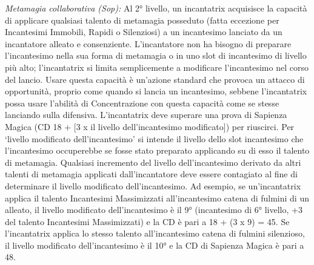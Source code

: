 \documentclass[a4paper]{report}
\begin{document}
\begin{multicols}{2}
\textit{Metamagia collaborativa (Sop):} Al 2° livello, un incantatrix acquisisce la capacità di applicare qualsiasi talento di metamagia posseduto (fatta eccezione per Incantesimi Immobili, Rapidi o Silenziosi) a un incantesimo lanciato da un incantatore alleato e consenziente. L'incantatore non ha bisogno di preparare l'incantesimo nella sua forma di metamagia o in uno slot di incantesimo di livello più alto; l'incantatrix si limita semplicemente a modificare l'incantesimo nel corso del lancio. Usare questa capacità è un'azione standard che provoca un attacco di opportunità, proprio come quando si lancia un incantesimo, sebbene l'incantatrix possa usare l'abilità di Concentrazione con questa capacità come se stesse lanciando sulla difensiva. L'incantatrix deve superare una prova di Sapienza Magica (CD 18 + [3 x il livello dell'incantesimo modificato]) per riuscirci. Per \enquote*{livello modificato dell'incantesimo} si intende il livello dello slot incantesimo che l'incantesimo occuperebbe se fosse stato preparato applicando su di esso il talento di metamagia. Qualsiasi incremento del livello dell'incantesimo derivato da altri talenti di metamagia applicati dall'incantatore deve essere contagiato al fine di determinare il livello modificato dell'incantesimo. Ad esempio, se un'incantatrix applica il talento Incantesimi Massimizzati all'incantesimo catena di fulmini di un alleato, il livello modificato dell'incantesimo è il 9° (incantesimo di 6° livello, +3 del talento Incantesimi Massimizzati) e la CD è pari a 18 + (3 x 9) = 45. Se l'incantatrix applica lo stesso talento all'incantesimo catena di fulmini silenzioso, il livello modificato dell'incantesimo è il 10° e la CD di Sapienza Magica è pari a 48.


\end{multicols}
\end{document}
